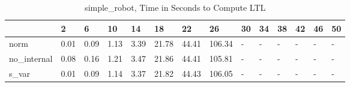 \begin{table}
\caption{simple_robot, Time in Seconds to Compute LTL}
\label{simple_robot_LTL_time}
\begin{tabular}{llllllllllllll}
\toprule
 & 2 & 6 & 10 & 14 & 18 & 22 & 26 & 30 & 34 & 38 & 42 & 46 & 50 \\
\midrule
norm & 0.01 & 0.09 & 1.13 & 3.39 & 21.78 & 44.41 & 106.34 & - & - & - & - & - & - \\
no_internal & 0.08 & 0.16 & 1.21 & 3.47 & 21.86 & 44.41 & 105.81 & - & - & - & - & - & - \\
s_var & 0.01 & 0.09 & 1.14 & 3.37 & 21.82 & 44.43 & 106.05 & - & - & - & - & - & - \\
\bottomrule
\end{tabular}
\end{table}
